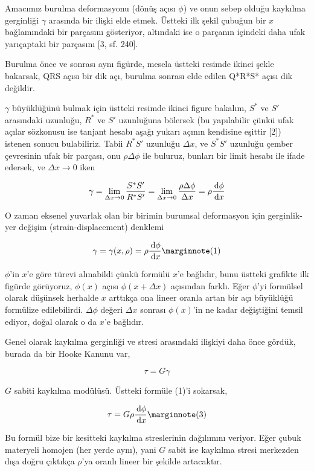 \documentclass[12pt,fleqn]{article}\usepackage{../../common}
\begin{document}
Amacımız burulma deformasyonu (dönüş açısı $\phi$) ve onun sebep olduğu kaykılma
gerginliği $\gamma$ arasında bir ilişki elde etmek. Üstteki ilk şekil çubuğun
bir $x$ bağlamındaki bir parçasını gösteriyor, altındaki ise o parçanın içindeki
daha ufak yarıçaptaki bir parçasını [3, sf. 240].

Burulma önce ve sonrası aynı figürde, mesela üstteki resimde ikinci şekle
bakarsak, QRS açısı bir dik açı, burulma sonrası elde edilen Q*R*S* açısı
dik değildir.

$\gamma$ büyüklüğünü bulmak için üstteki resimde ikinci figure bakalım, $S^{\ast}$ ve
$S'$ arasındaki uzunluğu, $R^{\ast}$ ve $S'$ uzunluğuna bölersek (bu yapılabilir
çünkü ufak açılar sözkonusu ise tanjant hesabı aşağı yukarı açının kendisine
eşittir [2]) istenen sonucu bulabiliriz. Tabii $R^{\ast}S'$ uzunluğu $\Delta x$,
ve $S^{\ast}S'$ uzunluğu çember çevresinin ufak bir parçası, onu  $\rho \Delta \phi$
ile buluruz, bunları bir limit hesabı ile ifade edersek, ve $\Delta x \to 0$
iken

$$
\gamma = \lim_{\Delta x \to 0} \frac{S^{\ast}S'}{R^{\ast} S'} =
\lim_{\Delta x \to 0} \frac{\rho \Delta \phi}{\Delta x} =
\rho \frac{\,\mathrm{d} \phi}{\,\mathrm{d} x}
$$

O zaman eksenel yuvarlak olan bir birimin burumsal deformasyon için
gerginlik-yer değişim (strain-displacement) denklemi

$$
\gamma = \gamma(x,\rho) = \rho \frac{\ud \phi}{\ud x}
\mlabel{1}
$$

$\phi$'in $x$'e göre türevi alınabildi çünkü formülü $x$'e bağlıdır, bunu
üstteki grafikte ilk figürde görüyoruz, $\phi(x)$ açısı $\phi(x+\Delta x)$
açısından farklı. Eğer $\phi$'yi formülsel olarak düşünsek herhalde $x$ arttıkça
ona lineer oranla artan bir açı büyüklüğü formülize edilebilirdi. $\Delta \phi$
değeri $\Delta x$ sonrası $\phi(x)$'in ne kadar değiştiğini temsil ediyor,
doğal olarak o da $x$'e bağlıdır.

Genel olarak kaykılma gerginliği ve stresi arasındaki ilişkiyi daha önce gördük,
burada da bir Hooke Kanunu var,

$$
\tau = G \gamma
$$

$G$ sabiti kaykılma modülüsü. Üstteki formüle (1)'i sokarsak,

$$
\tau = G \rho \frac{\ud \phi}{\ud x}
\mlabel{3}
$$

Bu formül bize bir kesitteki kaykılma streslerinin dağılımını veriyor. Eğer
çubuk materyeli homojen (her yerde aynı), yani $G$ sabit ise kaykılma stresi
merkezden dışa doğru çıktıkça $\rho$'ya oranlı lineer bir şekilde artacaktır.
\end{document}

